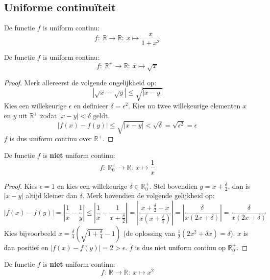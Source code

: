 \documentclass[main.tex]{subfiles}
\begin{document}
\subsection{Uniforme continu\"iteit}
\label{sec:unif-cont}


\begin{vb}
  De functie $f$ is uniform continu:
  \[ f:\ \mathbb{R} \rightarrow \mathbb{R}:\ x \mapsto \frac{x}{1+x^{2}} \]
\end{vb}

\begin{vb}
  De functie $f$ is uniform continu:
  \[ f:\ \mathbb{R}^{+} \rightarrow \mathbb{R}:\ x \mapsto \sqrt{x} \]

  \begin{proof}
    Merk allereerst de volgende ongelijkheid op:
    \[ |\sqrt{x} - \sqrt{y}| \le \sqrt{|x-y|} \]
    Kies een willekeurige $\epsilon$ en definieer $\delta = \epsilon^{2}$.
    Kies nu twee willekeurige elementen $x$ en $y$ uit $\mathbb{R}^{+}$ zodat $|x-y|< \delta$ geldt.
    \[ |f(x) - f(y)| \le  \sqrt{|x-y|} < \sqrt{\delta} = \sqrt{\epsilon^{2}} = \epsilon \]
    $f$ is dus uniform continu over $\mathbb{R}^{+}$.
  \end{proof}
\end{vb}

\begin{vb}
  De functie $f$ is \textbf{niet} uniform continu:
  \[ f:\ \mathbb{R}_{0}^{+} \rightarrow \mathbb{R}:\ x \mapsto \frac{1}{x} \]

  \begin{proof}
    Kies $\epsilon = 1$ en kies een willekeurige $\delta \in \mathbb{R}_{0}^{+}$.
    Stel bovendien $y = x + \frac{\delta}{2}$, dan is $|x-y|$ altijd kleiner dan $\delta$.
    Merk bovendien de volgende gelijkheid op:
    \[ |f(x)-f(y)| = \left| \frac{1}{x} - \frac{1}{y} \right| \le \left| \frac{1}{x} - \frac{1}{x + \frac{\delta}{2}} \right| = \left| \frac{x+\frac{\delta}{2}-x}{x(x+\frac{\delta}{2})}\right| = \left| \frac{\delta}{x(2x+\delta)} \right| = \frac{\delta}{x(2x+\delta)} \]
    Kies bijvoorbeeld $x = \frac{\delta}{4}\left(\sqrt{1+\frac{\delta}{4}}-1\right)$ (de oplossing van $\frac{1}{2}(2x^{2}+\delta x) = \delta$).
    $x$ is dan positief en $|f(x)-f(y)| = 2 > \epsilon$.
    $f$ is dus niet uniform continu op $\mathbb{R}_{0}^{+}$.
  \end{proof}
\end{vb}


\begin{vb}
  De functie $f$ is \textbf{niet} uniform continu:
  \[ f:\ \mathbb{R} \rightarrow \mathbb{R}:\ x \mapsto x^{2}\]
\end{vb}
\end{document}
